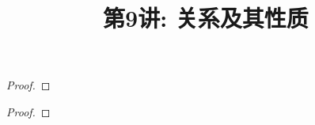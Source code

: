 \documentclass[a4paper, justified]{tufte-handout}
\title{第9讲: 关系及其性质}
\date{\zhtoday} %
\begin{document}
\maketitle
\noplagiarism %
\begin{abstract}
  \begin{center}{}
  \end{center}
\end{abstract}
\beginrequired

\begin{problem}[UD Problem 10.9]
\end{problem}

\begin{solution}
\end{solution}

\begin{problem}[UD Problem 10.10]
\end{problem}

\begin{solution}
\end{solution}

\begin{problem}[UD Problem 10.13]
\end{problem}

\begin{proof}
\end{proof}

\begin{problem}[UD Problem 11.4]
\end{problem}

\begin{solution}
\end{solution}

\begin{problem}[UD Problem 11.8]
\end{problem}

\begin{proof}
\end{proof}

\begin{problem}[UD Problem 11.10]
\end{problem}
\end{document}
